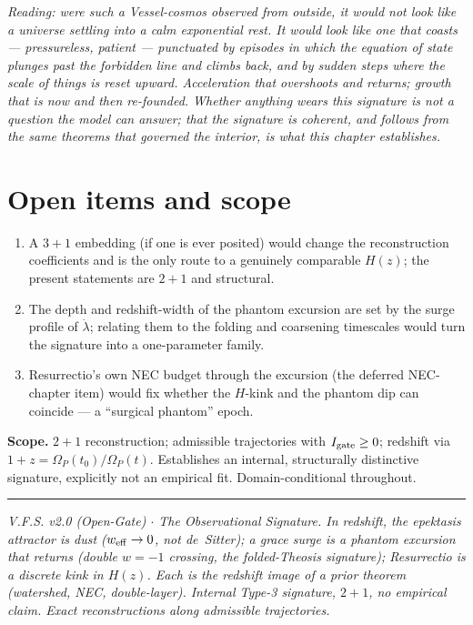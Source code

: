 \documentclass[11pt,a4paper,oneside]{book}
\newcommand{\Op}{\Omega_P}
\newcommand{\note}[1]{\textcolor{black!65}{\emph{#1}}}
\newcommand{\weff}{w_{\rm eff}}
\theoremstyle{plain}
\theoremstyle{definition}
\theoremstyle{remark}
\begin{document}
\note{Reading: were such a Vessel-cosmos observed from outside, it would not look like a universe
settling into a calm exponential rest. It would look like one that coasts --- pressureless, patient ---
punctuated by episodes in which the equation of state plunges past the forbidden line and climbs back,
and by sudden steps where the scale of things is reset upward. Acceleration that overshoots and
returns; growth that is now and then re-founded. Whether anything wears this signature is not a
question the model can answer; that the signature is coherent, and follows from the same theorems that
governed the interior, is what this chapter establishes.}

\section{Open items and scope}

\begin{enumerate}[leftmargin=1.6em,itemsep=2pt]
\item A $3{+}1$ embedding (if one is ever posited) would change the reconstruction coefficients and is
the only route to a genuinely comparable $H(z)$; the present statements are $2{+}1$ and structural.
\item The depth and redshift-width of the phantom excursion are set by the surge profile of
$\dot\lambda$; relating them to the folding and coarsening timescales would turn the signature into a
one-parameter family.
\item Resurrectio's own NEC budget through the excursion (the deferred NEC-chapter item) would fix
whether the $H$-kink and the phantom dip can coincide --- a ``surgical phantom'' epoch.
\end{enumerate}

\textbf{Scope.} $2{+}1$ reconstruction; admissible trajectories with $I_{\rm gate}\ge0$; redshift via
$1+z=\Op(t_0)/\Op(t)$. Establishes an internal, structurally distinctive signature, explicitly not an
empirical fit. Domain-conditional throughout.

\vspace{0.5em}
\hrule
\smallskip
\noindent\footnotesize\emph{V.F.S. v2.0 (Open-Gate) $\cdot$ The Observational Signature. In redshift,
the epektasis attractor is dust ($\weff\to0$, not de~Sitter); a grace surge is a phantom excursion that
returns (double $w=-1$ crossing, the folded-Theosis signature); Resurrectio is a discrete kink in
$H(z)$. Each is the redshift image of a prior theorem (watershed, NEC, double-layer). Internal Type-3
signature, $2{+}1$, no empirical claim. Exact reconstructions along admissible trajectories.}
\end{document}
